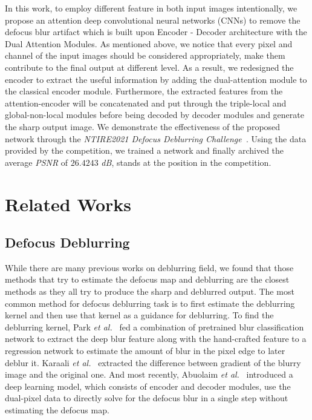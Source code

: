 \documentclass[final]{cvpr}
\begin{document}
In this work, to employ different feature in both input images intentionally, we propose an attention deep convolutional neural networks (CNNs) to remove the defocus blur artifact which is built upon Encoder - Decoder architecture with the Dual Attention Modules. As mentioned above, we notice that every pixel and channel of the input images should be considered appropriately, make them contribute to the final output at different level.  As a result, we redesigned the encoder to extract the useful information by adding the dual-attention module to the classical encoder module. Furthermore, the extracted features from the attention-encoder will be concatenated and put through the triple-local and global-non-local modules before being decoded by decoder modules and generate the sharp output image. We demonstrate the effectiveness of the proposed network through the \textit{NTIRE2021 Defocus Deblurring Challenge~\cite{ntire}}. Using the data provided by the competition, we trained a network and finally archived the average \textit{PSNR} of $26.4243$ \textit{dB}, stands at the  position in the competition.

\section{Related Works}

\subsection{Defocus Deblurring}

While there are many previous works on deblurring field, we found that those methods that try to estimate the defocus map and deblurring are the closest methods as they all try to produce the sharp and deblurred output. The most common method for defocus deblurring task is to first estimate the deblurring kernel and then use that kernel as a guidance for deblurring. To find the deblurring kernel, Park \textit{et al.}~\cite{park} fed a combination of pretrained blur classification network to extract the deep blur feature along with the hand-crafted feature to a regression network to estimate the amount of blur in the pixel edge to later deblur it. Karaali \textit{et al.}~\cite{karaali} extracted the difference between gradient of the blurry image and the original one. And most recently, Abuolaim \textit{et al.}~\cite{abuolaim2020defocus}  introduced a deep learning model, which consists of encoder and decoder modules, use the dual-pixel data to directly solve for the defocus blur in a single step without estimating the defocus map.
\end{document}
